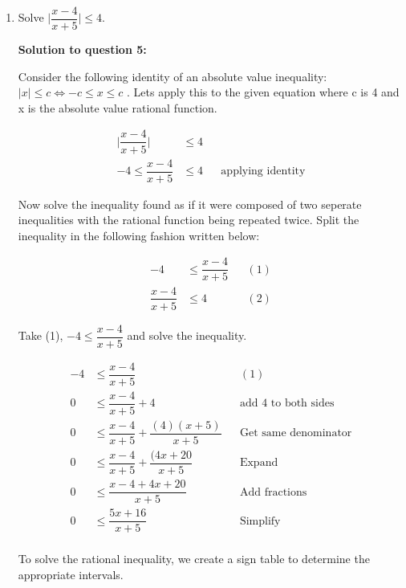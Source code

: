 \documentclass[12pt]{book}
\begin{document}
\begin{enumerate}
\item Solve $\bigg|\dfrac{x-4}{x+5}\bigg| \le 4$.

\vspace{0.3cm} 
\textbf{Solution to question 5:}

\vspace{0.5cm}
 Consider the following identity of an absolute value inequality: $|x| \leq c \Longleftrightarrow -c \leq x \leq c$
 . Lets apply this to the given equation where c is 4 and x is the absolute value rational function.
 \vspace{-0.3cm}

 \begin{align*}
    \bigg|\dfrac{x-4}{x+5}\bigg| &\le 4 \\
    -4 \le \dfrac{x-4}{x+5} & \le 4 && \text{applying identity}
 \end{align*}

Now solve the inequality found as if it were composed of two seperate inequalities with the rational function being repeated twice. Split the inequality in the following fashion written below:

\begin{align*}
    -4 &\le \dfrac{x-4}{x+5} && (1)\\
    \dfrac{x-4}{x+5} &\le 4 && (2)
\end{align*}

\vspace{1cm}

Take (1), $-4 \le \dfrac{x-4}{x+5}$ and solve the inequality.

\begin{align*}
    -4 &\le \dfrac{x-4}{x+5} && (1)\\
    0 &\le \dfrac{x-4}{x+5} + 4 && \text{add 4 to both sides} \\
    0 &\le \dfrac{x-4}{x+5} + \dfrac{(4)(x+5)}{x+5} && \text{Get same denominator} \\
    0 &\le \dfrac{x-4}{x+5} + \dfrac{(4x+20}{x+5} && \text{Expand} \\
    0 &\le \dfrac{x-4+4x+20}{x+5} && \text{Add fractions} \\
    0 &\le \dfrac{5x+16}{x+5} && \text{Simplify} \\
\end{align*}

\newpage

\begin{center}
To solve the rational inequality, we create a sign table
 to determine the appropriate intervals.
\end{center}
\vspace{0.5cm}


\end{enumerate}
\end{document}
